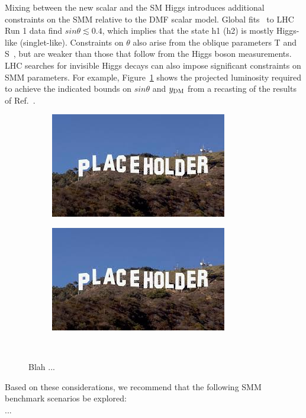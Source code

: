 Mixing between the new scalar and the SM Higgs introduces additional constraints on the SMM relative to the DMF scalar model.  Global fits~\cite{Farzinnia:2013pga,Belanger:2013kya} to LHC Run 1 data find $sin\theta \lesssim 0.4$, which implies that the state h1 (h2) is mostly Higgs-like (singlet-like). Constraints on $\theta$ also arise from the oblique parameters T and S~\cite{Baek:2011aa}, but are weaker than those that follow from the Higgs boson measurements.  LHC searches for invisible Higgs decays can also impose significant constraints on SMM parameters.  For example, Figure~\ref{fig:recast} shows the projected luminosity required to achieve the indicated bounds on $sin\theta$ and $y_{\rm DM}$ from a recasting of the results of Ref.~\cite{CMShinv}.

\begin{figure}[hbtp]
\centering
\begin{subfigure}[b]{0.49\textwidth}
  \includegraphics[width=\textwidth]{./figures/placeholder.jpg}
\end{subfigure}
\begin{subfigure}[b]{0.49\textwidth}
  \includegraphics[width=\textwidth]{./figures/placeholder.jpg}
\end{subfigure}
~\\
  \caption{ Blah ... }
  \label{fig:recast}
\end{figure}

Based on these considerations, we recommend that the following SMM benchmark scenarios be explored: 
~\\
...




